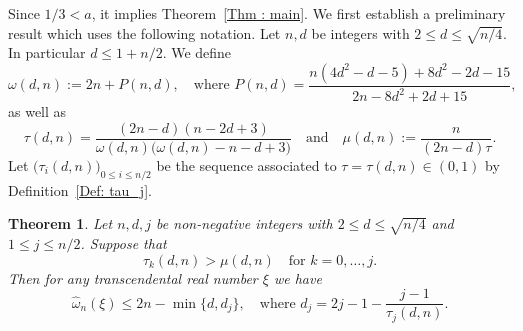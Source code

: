 \documentclass[JEP,XML,SOM,Unicode,NoFloatCountersInSection,published]{cedram}
\newcommand\homega{\widehat{\omega}}\newcommand\HH{\mathcal{H}}
\newcommand\AND{\quad\text{and}\quad}
\theoremstyle{definition}
\theoremstyle{plain}
\newtheorem{Thm}{Theorem}[section]
\begin{document}
Since $1/3 < a$, it implies Theorem~\ref{Thm : main}. We first establish a preliminary result which uses the following notation. Let $n,d$ be integers with $2\leq d \leq \sqrt{n/4}$. In particular $d\leq 1+n/2$. We define
\[
\omega(d,n) := 2n+P(n,d), \quad \textrm{where } P(n,d) = \frac{n(4d^2-d-5)+8d^2-2d-15}{2n-8d^2+2d+15},
\]
as well as
\[
\tau(d,n) = \frac{(2n-d)(n-2d+3)}{\omega(d,n)\big(\omega(d,n)-n-d+3\big)} \AND \mu(d,n):= \frac{n}{(2n-d)\tau}.
\]
Let $\big(\tau_i(d,n)\big)_{0\leq i\leq n/2}$ be the sequence associated to $\tau=\tau(d,n)\in(0,1)$ by Definition~\ref{Def: tau_j}.

\begin{Thm}
\label{Thm: main theorem under condition}
Let $n,d, j$ be non-negative integers with $2\leq d \leq \sqrt{n/4}$ and $1\leq j\leq n/2$. Suppose that
\begin{equation}
\label{eq: condition sur j}
\tau_k(d,n) > \mu(d,n) \quad \textrm{for $k=0,\dots,j$}.
\end{equation}
Then for any transcendental real number $\xi$ we have
\begin{equation}
\label{eq proof: resultat main a montrer}
\homega_n(\xi)\leq 2n- \min\big\{d,d_j\big\}, \quad \textrm{where } d_j= 2j-1-\frac{j-1}{\tau_j(d,n)}.
\end{equation}
\end{Thm}
\end{document}
